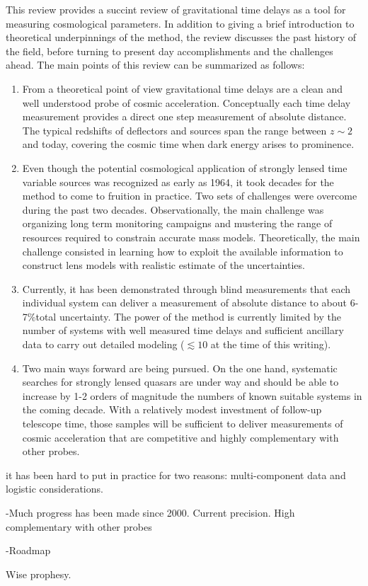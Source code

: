 This review provides a succint review of gravitational time delays as
a tool for measuring cosmological parameters. In addition to giving a
brief introduction to theoretical underpinnings of the method, the
review discusses the past history of the field, before turning to
present day accomplishments and the challenges ahead. The main points
of this review can be summarized as follows:

\begin{enumerate}
\item From a theoretical point of view gravitational time delays are a clean and well understood probe of cosmic acceleration. Conceptually each time delay measurement provides a direct one step measurement of absolute distance. The typical redshifts of deflectors and sources span the range between $z\sim2$ and today, covering the cosmic time when dark energy arises to prominence.
\item Even though the potential cosmological application of strongly lensed time variable sources was recognized as early as 1964, it took decades for the method to come to fruition in practice. Two sets of challenges were overcome during the past two decades. Observationally, the main challenge was organizing long term monitoring campaigns and mustering the range of resources required to constrain accurate mass models. Theoretically, the main challenge consisted in learning how to exploit the available information to construct lens models with realistic estimate of the uncertainties.
\item Currently, it has been demonstrated through blind measurements that each individual system can deliver a measurement of absolute distance to about 6-7\%total uncertainty.  The power of the method is currently limited by the number of systems with well measured time delays and sufficient ancillary data to carry out detailed modeling ($\lesssim10$ at the time of this writing).
\item Two main ways forward are being pursued. On the one hand, systematic searches for strongly lensed quasars are under way and should be able to increase by 1-2 orders of magnitude the numbers of known suitable systems in the coming decade. With a relatively modest investment of follow-up telescope time, those samples will be sufficient to deliver measurements of cosmic acceleration that are competitive and highly complementary with other probes.
\end{enumerate}


it has been hard to put in practice for two reasons: multi-component
data and logistic considerations.

-Much progress has been made since 2000. Current precision. High
complementary with other probes

-Roadmap


Wise prophesy.
